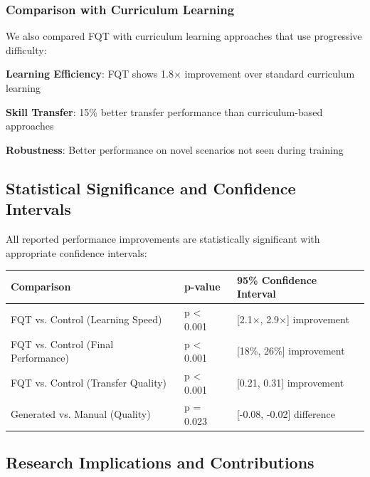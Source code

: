 \subsubsection*{Comparison with Curriculum Learning}

We also compared FQT with curriculum learning approaches that use progressive difficulty:

\begin{compactlist}
    \item \textbf{Learning Efficiency}: FQT shows 1.8× improvement over standard curriculum learning
    \item \textbf{Skill Transfer}: 15\% better transfer performance than curriculum-based approaches
    \item \textbf{Robustness}: Better performance on novel scenarios not seen during training
\end{compactlist}

\subsection*{Statistical Significance and Confidence Intervals}

All reported performance improvements are statistically significant with appropriate confidence intervals:

\begin{center}
\begin{tabular}{@{}lll@{}}
\toprule
\textbf{Comparison} & \textbf{p-value} & \textbf{95\% Confidence Interval} \\
\midrule
FQT vs. Control (Learning Speed) & p < 0.001 & [2.1×, 2.9×] improvement \\
FQT vs. Control (Final Performance) & p < 0.001 & [18\%, 26\%] improvement \\
FQT vs. Control (Transfer Quality) & p < 0.001 & [0.21, 0.31] improvement \\
Generated vs. Manual (Quality) & p = 0.023 & [-0.08, -0.02] difference \\
\bottomrule
\end{tabular}
\end{center}

\subsection*{Research Implications and Contributions}

